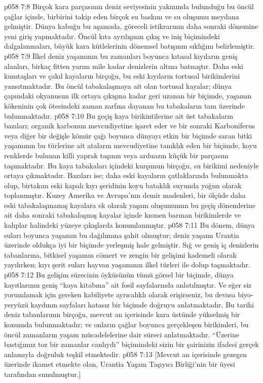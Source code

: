 \vs p058 7:8 Birçok kara parçasının deniz seviyesinin yakınında bulunduğu bu öncül çağlar içinde, birbirini takip eden birçok su baskını ve su oluşumu meydana gelmiştir. Dünya kabuğu bu aşamada, göreceli istikrarının daha sonraki dönemine yeni giriş yapmaktadır. Öncül kıta ayrılışının çıkış ve iniş biçimindeki dalgalanmaları, büyük kara kütlelerinin dönemsel batışının sıklığını belirlemiştir.
\vs p058 7:9 İlkel deniz yaşamının bu zamanları boyunca kıtasal kıyıların geniş alanları, birkaç fitten yarım mile kadar denizlerin altına batmıştır. Daha eski kumtaşları ve çakıl kayaların birçoğu, bu eski kıyıların tortusal birikimlerini yansıtmaktadır. Bu öncül tabakalaşmaya ait olan tortusal kayalar; dünya çapındaki okyanusun ilk ortaya çıkışına kadar geri uzanan bir biçimde, yaşamın kökeninin çok ötesindeki zaman zarfına dayanan bu tabakaların tam üzerinde bulunmaktadır.
\vs p058 7:10 Bu geçiş kaya birikintilerine ait üst tabakaların bazıları; organik karbonun mevcudiyetine işaret eder ve bir sonraki Karboniferus veya diğer bir değişle kömür çağı boyunca dünyayı etkin bir biçimde saran bitki yaşamının bu türlerine ait ataların mevcudiyetine tanıklık eden bir biçimde, koyu renklerde bulunan killi yaprak taşının veya arduazın küçük bir parçasını taşımaktadır. Bu kaya tabakaları içindeki kurşunun birçoğu, su birikimi nedeniyle ortaya çıkmaktadır. Bazıları ise; daha eski kayaların çatlaklarında bulunmakta olup, birtakım eski kapalı kıyı şeridinin koyu bataklık suyunda yoğun olarak toplanmıştır. Kuzey Amerika ve Avrupa’nın demir madenleri, bir ölçüde daha eski tabakalaşmamış kayalara ek olarak yaşam oluşumunun bu geçiş dönemlerine ait daha sonraki tabakalaşmış kayalar içinde kısmen barınan birikimlerde ve kalıplar halindeki yüzeye çıkışlarda konumlanmıştır.
\vs p058 7:11 Bu dönem, dünya suları boyunca yaşamın bu dağılımına şahit olmuştur; deniz yaşamı Urantia üzerinde oldukça iyi bir biçimde yerleşmiş hale gelmiştir. Sığ ve geniş iç denizlerin tabanlarına, bitkisel yaşamın cömert ve zengin bir gelişimi kademeli olarak yayılırken; kıyı şerit suları hayvan yaşamının ilkel türleri ile dolup taşmaktadır.
\vs p058 7:12 Bu gelişim sürecinin öyküsünün tümü görsel bir biçimde, dünya kayıtlarının geniş “kaya kitabına” ait fosil sayfalarında anlatılmıştır. Ve eğer siz yorumlamak için gereken kabiliyete ayrıcalıklı olarak erişirseniz, bu devasa biyo\hyp{}yeryüzü kaydının sayfaları hatasız bir biçimde doğruyu anlatmaktadır. Bu tarihi deniz tabanlarının birçoğu, mevcut an içerisinde kara üstünde yükselmiş bir konumda bulunmaktadır; ve onların çağlar boyunca gerçekleşen birikimleri, bu öncül zamanların yaşam mücadelelerine dair süreci anlatmaktadır. “Üzerine bastığımız toz bir zamanlar canlıydı” biçimindeki sizin bir şairinizin ifadesi gerçek anlamıyla doğruluk teşkil etmektedir.
\vs p058 7:13 [Mevcut an içerisinde gezegen üzerinde ikamet etmekte olan, Urantia Yaşam Taşıyıcı Birliği’nin bir üyesi tarafından sunulmuştur.]
